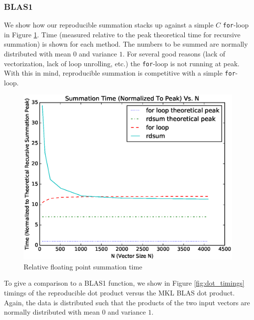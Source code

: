   \subsubsection{BLAS1}

    We show how our reproducible summation stacks up against a simple $C$ \texttt{for}-loop in Figure \ref{fig:forloop_timings}. Time (measured relative to the peak theoretical time for recursive summation) is shown for each method. The numbers to be summed are normally distributed with mean $0$ and variance $1$. For several good reasons (lack of vectorization, lack of loop unrolling, etc.) the \texttt{for}-loop is not running at peak. With this in mind, reproducible summation is competitive with a simple \texttt{for}-loop.
  \begin{figure}[H]
  \begin{center}
  \includegraphics[width=\textwidth]{plots/sum_comparison}
  \caption{Relative floating point summation time}
  \label{fig:forloop_timings}
  \end{center}
  \end{figure}
    To give a comparison to a BLAS1 function, we show in Figure \ref{fig:dot_timings} timings of the reproducible dot product versus the MKL BLAS dot product. Again, the data is distributed such that the products of the two input vectors are normally distributed with mean $0$ and variance $1$.
